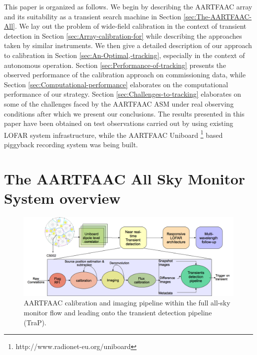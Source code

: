 \documentclass[referee]{aa}
\begin{document}
This paper is  organized as follows.  We begin by  describing the AARTFAAC array
and   its    suitability   as   a   transient   search    machine   in   Section
\ref{sec:The-AARTFAAC-All}. We lay out  the problem of wide-field calibration in
the  context of transient  detection in  Section \ref{sec:Array-calibration-for}
while describing  the approaches taken by  similar instruments.  We  then give a
detailed   description    of   our   approach   to    calibration   in   Section
\ref{sec:An-Optimal,-tracking},   especially  in   the  context   of  autonomous
operation.   Section  \ref{sec:Performance-of-tracking}  presents  the  observed
performance  of the calibration  approach on  commissioning data,  while Section
\ref{sec:Computational-performance} elaborates  on the computational performance
of our strategy.  Section \ref{sec:Challenges-to-tracking} elaborates on some of
the challenges faced  by the AARTFAAC ASM under  real observing conditions after
which we present our conclusions. The  results presented in this paper have been
obtained  on  test observations  carried  out  by  using existing  LOFAR  system
infrastructure,                 while                the                AARTFAAC
Uniboard    \footnote{http://www.radionet-eu.org/uniboard}    based    piggyback
recording system was being built.


\section{\label{sec:The-AARTFAAC-All}The AARTFAAC All Sky Monitor System
overview} 

\begin{figure}[htbp]
\centering
\includegraphics[width=1\textwidth]{Figs/AFAAC_blkdia_latest.png}
\caption{AARTFAAC  calibration  and imaging  pipeline  within  the full  all-sky
  monitor flow and leading onto the transient detection pipeline (TraP).}
\label{fig:The-AARTFAAC-calibration}
\end{figure}
\end{document}
